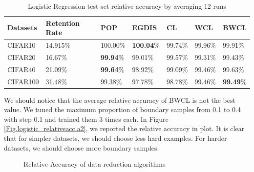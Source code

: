 \begin{table}[H]
    \centering
    \begin{tabular}{|l|l|l|l|l|l|l|}
    \hline
        Datasets & Retention Rate  & POP & EGDIS & CL & WCL & BWCL \\ \hline
        CIFAR10 & 14.915\% & 100.00\% & \textbf{100.04}\% & 99.74\% & 99.96\% & 99.91\% \\ \hline
        CIFAR20 & 16.67\% & \textbf{99.94}\% & 99.01\% & 99.57\% & 99.31\% & 99.43\% \\ \hline
        CIFAR40 & 21.09\% & \textbf{99.64}\% & 98.92\% & 99.09\% & 99.46\% & 99.63\% \\ \hline
        CIFAR100 & 31.48\% & 99.38\% & 97.78\% & 98.78\% & 99.46\% & \textbf{99.49}\% \\ \hline
    \end{tabular}
    \caption{Logistic Regression test set relative accuracy by averaging 12 runs}
    \label{lg_acc}
\end{table}

 We should notice that the average relative accuracy of BWCL is not the best value. We tuned the maximum proportion of boundary samples from 0.1 to 0.4 with step 0.1 and trained them 3 times each. In Figure \ref{Fig.logistic_relativeacc.a2}, we reported the relative accuracy in plot. It is clear that for simpler datasets, we should choose less hard examples. For harder datasets, we should choose more boundary samples. 

\begin{figure}[H]
\centering  
{}
\caption{Relative Accuracy of data reduction algorithms}
\label{Fig.logistic_relativeacc}
\end{figure}

